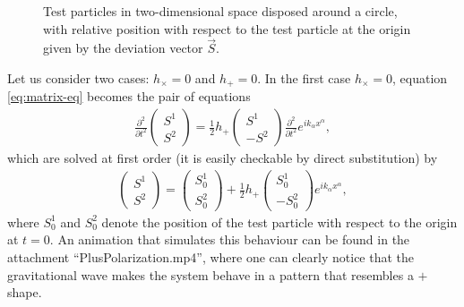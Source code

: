 \documentclass[a4paper]{article}
\begin{document}
\begin{figure}[h]
  \centering
\caption{Test particles in two-dimensional space disposed around a circle, with relative position with respect to the test particle at the origin given by the deviation vector $\vec{S}$.}
\label{fig:test-particles}

\end{figure}

Let us consider two cases: $h_{\times} = 0$ and $h_{+} = 0$.
In the first case $h_{\times} = 0$, equation \eqref{eq:matrix-eq} becomes the pair of equations
\begin{align}
  \frac{\partial^2}{\partial t^2}\begin{pmatrix}
    S^1\\
    S^2
  \end{pmatrix} = \frac{1}{2}h_{+}\begin{pmatrix}
    S^1\\
    -S^2
  \end{pmatrix}\frac{\partial^2}{\partial t^2}e^{ik_{\alpha}x^{\alpha}},
\end{align}
which are solved at first order (it is easily checkable by direct substitution) by
\begin{align}
  \begin{pmatrix}
    S^1\\
    S^2
  \end{pmatrix} = \begin{pmatrix}
    S^1_0\\
    S^2_0
  \end{pmatrix}+\frac{1}{2}h_{+}\begin{pmatrix}
    S^1_0\\
    -S^2_0
  \end{pmatrix}e^{ik_{\alpha}x^{\alpha}},
\end{align}
where $S^1_0$ and $S^2_0$ denote the position of the test particle with respect to the origin at $t=0$. An animation that simulates this behaviour can be found in the attachment ``PlusPolarization.mp4'', where one can clearly notice that the gravitational wave makes the system behave in a pattern that resembles a $+$ shape.
\end{document}
